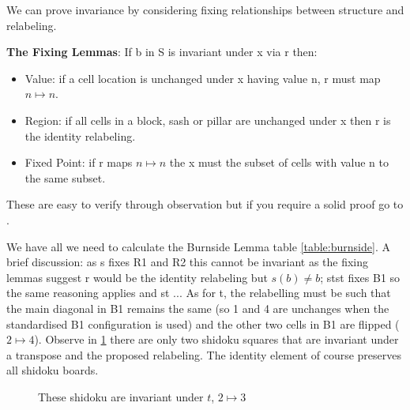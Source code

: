 \documentclass[a4paper,11pt]{report}
\newcounter{row}
\newcounter{col}
\newcounter{rowa}
\newcounter{cola}
\newcommand\setrowa[4]{
  \setcounter{cola}{1}
  \foreach \n in {#1, #2, #3, #4} {
    \edef\x{\value{cola} - 0.5}
    \edef\y{4.5 - \value{rowa}}
    \node[anchor=center] at (\x, \y) {\n};
    \stepcounter{cola}
  }
  \stepcounter{rowa}
}
\begin{document}
We can prove invariance by considering fixing relationships between structure and relabeling. 

\textbf{The Fixing Lemmas}: If b in S is invariant under x via r then:
\begin{itemize}
\item Value: if a cell location is unchanged under x having value n, r must map $n \mapsto n$.
\item Region: if all cells in a block, sash or pillar are unchanged under x then r is the identity relabeling. 
\item Fixed Point: if r maps $n\mapsto n$ the x must the subset of cells with value n to the same subset.
\end{itemize}
These are easy to verify through observation but if you require a solid proof go to \cite{minimal complete shidoku symmetry groups pg 10}.

We have all we need to calculate the Burnside Lemma table \ref{table:burnside}. A brief discussion: as s fixes R1 and R2 this cannot be invariant as the fixing lemmas suggest r would be the identity relabeling but $s(b)\neq b$; stst fixes B1 so the same reasoning applies and st ... As for t, the relabelling must be such that the main diagonal in B1 remains the same (so 1 and 4 are unchanges when the standardised B1 configuration is used) and the other two cells in B1 are flipped ($2\mapsto 4$). Observe in \ref{fig:transpose} there are only two shidoku squares that are invariant under a transpose and the proposed relabeling. The identity element of course preserves all shidoku boards.

\begin{figure}[h]
\centering
{}
\caption{These shidoku are invariant under $t$, $2\mapsto 3$}
\label{fig:transpose}
\end{figure}
\end{document}
